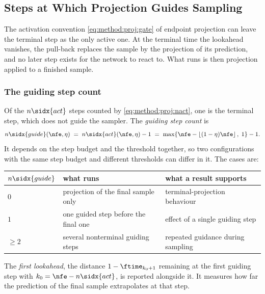\subsection{Steps at Which Projection Guides Sampling}\label{sec:method:degenerate}

The activation convention \eqref{eq:method:proj:gate} of endpoint projection can leave the terminal step
as the only active one. At the terminal time the lookahead vanishes, the pull-back replaces the sample
by the projection of its prediction, and no later step exists for the network to react to. What runs is
then projection applied to a finished sample.

\subsubsection*{The guiding step count}

Of the $n\sidx{act}$ steps counted by \eqref{eq:method:proj:nact}, one is the terminal step, which does
not guide the sampler. The \emph{guiding step count} is
\begin{equation}\label{eq:method:degen:ngen}
  n\sidx{guide}(\nfe,\eta)
  \;=\; n\sidx{act}(\nfe,\eta) - 1
  \;=\; \max\!\left\{\nfe - \left\lfloor(1-\eta)\nfe\right\rfloor,\;1\right\} - 1 .
\end{equation}
It depends on the step budget and the threshold together, so two configurations with the same step
budget and different thresholds can differ in it. The cases are:

\begin{center}
\begin{tabularx}{\linewidth}{lLL}
  \toprule
  $n\sidx{guide}$ & what runs & what a result supports \\
  \midrule
  $0$     & projection of the final sample only        & terminal-projection behaviour \\
  $1$     & one guided step before the final one       & effect of a single guiding step \\
  $\ge 2$ & several nonterminal guiding steps          & repeated guidance during sampling \\
  \bottomrule
\end{tabularx}
\end{center}

The \emph{first lookahead}, the distance $1-\ftime_{k_{0}+1}$ remaining at the first guiding step with
$k_{0} = \nfe - n\sidx{act}$, is reported alongside it. It measures how far the prediction of the final
sample extrapolates at that step.

